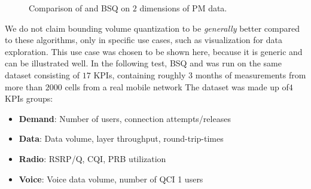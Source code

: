 			\begin{figure}[ht]
				\centering
				\caption[\kmeans{} and BSQ comparison on $2$-dimensional data]{Comparison of \kmeans{} and BSQ on $2$ dimensions of PM data.}
				\label{fig:kmeansbeanscomp}
			\end{figure}
			
			We do not claim bounding volume quantization to be \textit{generally} better compared to these algorithms, only in specific use cases, such as visualization for data exploration.
			This use case was chosen to be shown here, because it is generic and can be illustrated well.
			In the following test, \ac{BSQ} and \kmeans{} was run on the same dataset consisting of $17$ \acp{KPI}, containing roughly $3$ months of measurements from more than $2000$ cells from a real mobile network
			The dataset was  made up of$4$ \acp{KPI} groups:
			\begin{itemize}
				\item \textbf{Demand}: Number of users, connection attempts/releases
				\item \textbf{Data}: Data volume, layer throughput, round-trip-times
				\item \textbf{Radio}: RSRP/Q, CQI, PRB utilization
				\item \textbf{Voice}: Voice data volume, number of QCI 1 users
			\end{itemize}
			\noindent 
			

